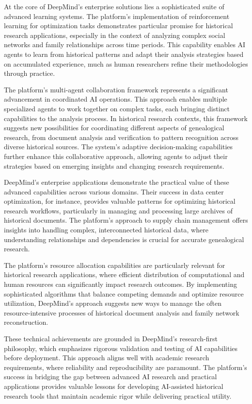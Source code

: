 \documentclass[
]{article}
\begin{document}
At the core of DeepMind's enterprise solutions lies a sophisticated
suite of advanced learning systems. The platform's implementation of
reinforcement learning for optimization tasks demonstrates particular
promise for historical research applications, especially in the context
of analyzing complex social networks and family relationships across
time periods. This capability enables AI agents to learn from historical
patterns and adapt their analysis strategies based on accumulated
experience, much as human researchers refine their methodologies through
practice.

The platform's multi-agent collaboration framework represents a
significant advancement in coordinated AI operations. This approach
enables multiple specialized agents to work together on complex tasks,
each bringing distinct capabilities to the analysis process. In
historical research contexts, this framework suggests new possibilities
for coordinating different aspects of genealogical research, from
document analysis and verification to pattern recognition across diverse
historical sources. The system's adaptive decision-making capabilities
further enhance this collaborative approach, allowing agents to adjust
their strategies based on emerging insights and changing research
requirements.

DeepMind's enterprise applications demonstrate the practical value of
these advanced capabilities across various domains. Their success in
data center optimization, for instance, provides valuable patterns for
optimizing historical research workflows, particularly in managing and
processing large archives of historical documents. The platform's
approach to supply chain management offers insights into handling
complex, interconnected historical data, where understanding
relationships and dependencies is crucial for accurate genealogical
research.

The platform's resource allocation capabilities are particularly
relevant for historical research applications, where efficient
distribution of computational and human resources can significantly
impact research outcomes. By implementing sophisticated algorithms that
balance competing demands and optimize resource utilization, DeepMind's
approach suggests new ways to manage the often resource-intensive
processes of historical document analysis and family network
reconstruction.

These technical achievements are grounded in DeepMind's research-first
philosophy, which emphasizes rigorous validation and testing of AI
capabilities before deployment. This approach aligns well with academic
research requirements, where reliability and reproducibility are
paramount. The platform's success in bridging the gap between advanced
AI research and practical applications provides valuable lessons for
developing AI-assisted historical research tools that maintain academic
rigor while delivering practical utility.
\end{document}
